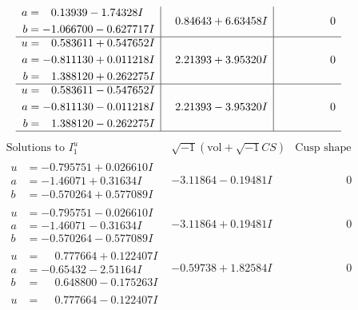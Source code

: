 \documentclass[1p]{elsarticle_modified}
\theoremstyle{definition}
\newcommand{\I}{\sqrt{-1}}
\begin{document}
$$\begin{array}{c|c|c}
\begin{aligned}
a &= \phantom{-}0.13939 - 1.74328 I \\
b &= -1.066700 - 0.627717 I\end{aligned}
 & \phantom{-}0.84643 + 6.63458 I & \phantom{-0.000000 } 0 \\ \hline\begin{aligned}
u &= \phantom{-}0.583611 + 0.547652 I \\
a &= -0.811130 + 0.011218 I \\
b &= \phantom{-}1.388120 + 0.262275 I\end{aligned}
 & \phantom{-}2.21393 + 3.95320 I & \phantom{-0.000000 } 0 \\ \hline\begin{aligned}
u &= \phantom{-}0.583611 - 0.547652 I \\
a &= -0.811130 - 0.011218 I \\
b &= \phantom{-}1.388120 - 0.262275 I\end{aligned}
 & \phantom{-}2.21393 - 3.95320 I & \phantom{-0.000000 } 0\\
 \hline 
 \end{array}$$\newpage$$\begin{array}{c|c|c}  
\text{Solutions to }I^u_{1}& \I (\text{vol} + \sqrt{-1}CS) & \text{Cusp shape}\\
 \hline 
\begin{aligned}
u &= -0.795751 + 0.026610 I \\
a &= -1.46071 + 0.31634 I \\
b &= -0.570264 + 0.577089 I\end{aligned}
 & -3.11864 - 0.19481 I & \phantom{-0.000000 } 0 \\ \hline\begin{aligned}
u &= -0.795751 - 0.026610 I \\
a &= -1.46071 - 0.31634 I \\
b &= -0.570264 - 0.577089 I\end{aligned}
 & -3.11864 + 0.19481 I & \phantom{-0.000000 } 0 \\ \hline\begin{aligned}
u &= \phantom{-}0.777664 + 0.122407 I \\
a &= -0.65432 - 2.51164 I \\
b &= \phantom{-}0.648800 - 0.175263 I\end{aligned}
 & -0.59738 + 1.82584 I & \phantom{-0.000000 } 0 \\ \hline\begin{aligned}
u &= \phantom{-}0.777664 - 0.122407 I \\

\end{aligned}
\end{array}$$
\end{document}
